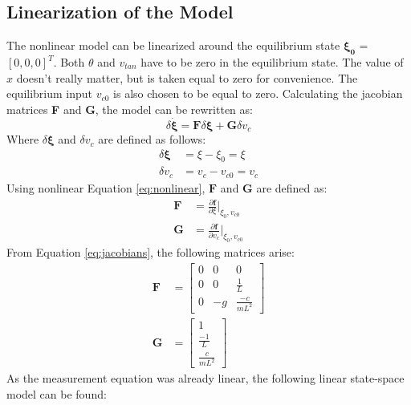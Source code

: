 \documentclass[a4paper,kul]{kulakarticle} %
\begin{document}
\subsection{Linearization of the Model}
\label{sec:linearization}
The nonlinear model can be linearized around the equilibrium state $\mathbf{\xi_0}$ = $[0,0,0]^T$. Both $\theta$ and $v_{tan}$ have to be zero in the equilibrium state. The value of $x$ doesn't really matter, but is taken equal to zero for convenience. The equilibrium input $v_{c0}$ is also chosen to be equal to zero. Calculating the jacobian matrices \textbf{F} and \textbf{G}, the model can be rewritten as:
\begin{equation}
	\delta\mathbf{\dot{\xi}} = \mathbf{F}\delta\mathbf{\xi} + \mathbf{G}\delta v_c
	\label{eq:deltaxidotlinear}
	\end{equation}
	Where $\delta\mathbf{\xi}$ and $\delta v_c$ are defined as follows:
	\begin{equation}
	\begin{split}
	\delta\mathbf{\xi} &= \xi - \xi_0 = \xi \\
	\delta v_c &= v_c - v_{c0} = v_c
	\end{split}
	\end{equation}
	Using nonlinear Equation \ref{eq:nonlinear}, $\mathbf{F}$ and $\mathbf{G}$ are defined as: 
	\begin{equation}
	\begin{split}
	\mathbf{F} &= \frac{\partial \mathbf{f}}{\partial \xi}\Bigr|_{\xi_0, v_{c0}}\\
	\mathbf{G} &= \frac{\partial \mathbf{f}}{\partial v_{c}}\Bigr|_{\xi_0, v_{c0}}
	\end{split}	
	\label{eq:jacobians}
	\end{equation}
	From Equation \ref{eq:jacobians}, the following matrices arise:
	\begin{equation}
	\begin{split}
	\mathbf{F} &= \begin{bmatrix}
	0&0&0\\0&0&\frac{1}{L}\\0&-g&\frac{-c}{mL^2}
	\end{bmatrix}\\
	\mathbf{G} &= \begin{bmatrix}
	1\\\frac{-1}{L}\\\frac{c}{mL^2}
	\end{bmatrix}
	\end{split}
	\end{equation}
	As the measurement equation was already linear, the following linear state-space model can be found:
	
\end{document}
